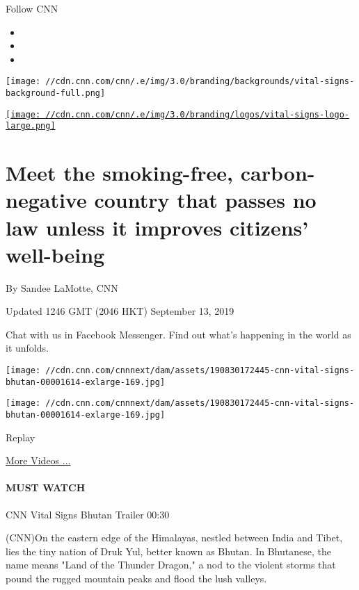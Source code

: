 Follow CNN

\begin{itemize}
\item
\item
\item
\end{itemize}

\texttt{[image: //cdn.cnn.com/cnn/.e/img/3.0/branding/backgrounds/vital-signs-background-full.png]}

\href{/specials/health/vital-signs}{\texttt{[image: //cdn.cnn.com/cnn/.e/img/3.0/branding/logos/vital-signs-logo-large.png]}}

\hypertarget{meet-the-smoking-free-carbon-negative-country-that-passes-no-law-unless-it-improves-citizens-well-being}{%
\section{Meet the smoking-free, carbon-negative country that passes no
law unless it improves citizens'
well-being}\label{meet-the-smoking-free-carbon-negative-country-that-passes-no-law-unless-it-improves-citizens-well-being}}

By Sandee LaMotte, CNN

Updated 1246 GMT (2046 HKT) September 13, 2019

Chat with us in Facebook Messenger. Find out what's happening in the
world as it unfolds.

\texttt{[image: //cdn.cnn.com/cnnnext/dam/assets/190830172445-cnn-vital-signs-bhutan-00001614-exlarge-169.jpg]}

\texttt{[image: //cdn.cnn.com/cnnnext/dam/assets/190830172445-cnn-vital-signs-bhutan-00001614-exlarge-169.jpg]}\href{javascript:void(0);}{}

Replay

\href{/videos}{More Videos ...}

\hypertarget{must-watch}{%
\paragraph{MUST WATCH}\label{must-watch}}

CNN Vital Signs Bhutan Trailer 00:30

(CNN)On the eastern edge of the Himalayas, nestled between India and
Tibet, lies the tiny nation of Druk Yul, better known as Bhutan. In
Bhutanese, the name means "Land of the Thunder Dragon," a nod to the
violent storms that pound the rugged mountain peaks and flood the lush
valleys.

